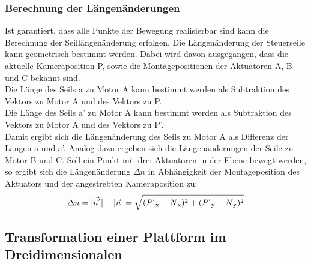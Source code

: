 \documentclass[a4paper, 12pt]{article}
\begin{document}
			\subsubsection{Berechnung der Längenänderungen}
				Ist garantiert, dass alle Punkte der Bewegung realisierbar sind kann die Berechnung der Seillängenänderung erfolgen. 
				Die Längenänderung der Steuerseile kann geometrisch bestimmt werden.
				Dabei wird davon ausgegangen, dass die aktuelle Kameraposition P, sowie die Montagepositionen der Aktuatoren A, B und C bekannt sind.\\
				Die Länge des Seils a zu Motor A kann bestimmt werden als Subtraktion des Vektors zu Motor A und des Vektors zu P.\\
				Die Länge des Seils a' zu Motor A kann bestimmt werden als Subtraktion des Vektors zu Motor A und des Vektors zu P'.\\
				Damit ergibt sich die Längenänderung des Seils zu Motor A als Differenz der Längen a und a'.
				Analog dazu ergeben sich die Längenänderungen der Seile zu Motor B und C.
				Soll ein Punkt mit drei Aktuatoren in der Ebene bewegt werden,
				so ergibt sich die Längenänderung $\Delta n$ in Abhängigkeit der Montageposition des Aktuators und der angestrebten Kameraposition zu:
				\begin{align}
					\Delta n =
					|\vec{n^{'}}|-|\vec{n}|=
					\sqrt	{
							(P^{'}\textsubscript{x}-N\textsubscript{x})^2+
							(P^{'}\textsubscript{y}-N\textsubscript{y})^2
							}
				\end{align}
		\subsection{Transformation einer Plattform im Dreidimensionalen}	
\end{document}
